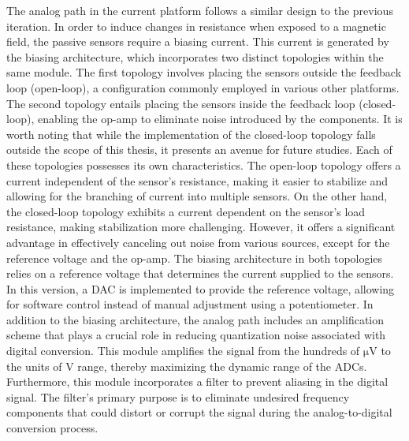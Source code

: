 The analog path in the current platform follows a similar design to the previous iteration. In order to induce changes in resistance when exposed to a magnetic field, the passive sensors require a biasing current. This current is generated by the biasing architecture, which incorporates two distinct topologies within the same module. The first topology involves placing the sensors outside the feedback loop (open-loop), a configuration commonly employed in various other platforms. The second topology entails placing the sensors inside the feedback loop (closed-loop), enabling the op-amp to eliminate noise introduced by the components. It is worth noting that while the implementation of the closed-loop topology falls outside the scope of this thesis, it presents an avenue for future studies. Each of these topologies possesses its own characteristics. The open-loop topology offers a current independent of the sensor's resistance, making it easier to stabilize and allowing for the branching of current into multiple sensors. On the other hand, the closed-loop topology exhibits a current dependent on the sensor's load resistance, making stabilization more challenging. However, it offers a significant advantage in effectively canceling out noise from various sources, except for the reference voltage and the op-amp. The biasing architecture in both topologies relies on a reference voltage that determines the current supplied to the sensors. In this version, a \ac{DAC} is implemented to provide the reference voltage, allowing for software control instead of manual adjustment using a potentiometer. In addition to the biasing architecture, the analog path includes an amplification scheme that plays a crucial role in reducing quantization noise associated with digital conversion. This module amplifies the signal from the hundreds of $\mathrm{\mu V}$ to the units of $\mathrm{V}$ range, thereby maximizing the dynamic range of the \ac{ADC}s. Furthermore, this module incorporates a filter to prevent aliasing in the digital signal. The filter's primary purpose is to eliminate undesired frequency components that could distort or corrupt the signal during the analog-to-digital conversion process.

